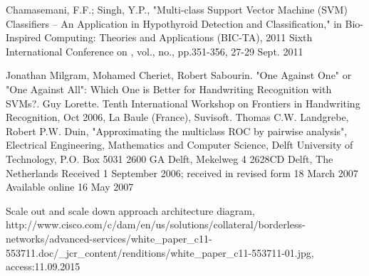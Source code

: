 \begin{thebibliography}{99}
Chamasemani, F.F.; Singh, Y.P., "Multi-class Support Vector Machine (SVM) Classifiers -- An Application in Hypothyroid Detection and Classification," in Bio-Inspired Computing: Theories and Applications (BIC-TA), 2011 Sixth International Conference on , vol., no., pp.351-356, 27-29 Sept. 2011

Jonathan Milgram, Mohamed Cheriet, Robert Sabourin. "One Against One" or "One Against
All": Which One is Better for Handwriting Recognition with SVMs?. Guy Lorette. Tenth
International Workshop on Frontiers in Handwriting Recognition, Oct 2006, La Baule (France),
Suvisoft.
Thomas C.W. Landgrebe, Robert P.W. Duin, "Approximating the multiclass ROC by pairwise analysis", Electrical Engineering, Mathematics and Computer Science, Delft University of Technology, P.O. Box 5031 2600 GA Delft,
Mekelweg 4 2628CD Delft, The Netherlands
Received 1 September 2006; received in revised form 18 March 2007
Available online 16 May 2007

Scale out and scale down approach architecture diagram, http://www.cisco.com/c/dam/en/us/solutions/collateral/borderless-networks/advanced-services/white\_paper\_c11-553711.doc/\_jcr\_content/renditions/white\_paper\_c11-553711-01.jpg, access:11.09.2015

\end{thebibliography}
